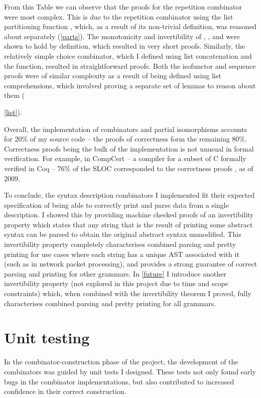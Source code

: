 \documentclass[12pt,a4paper,twoside,openright]{report}
\newcommand{\F}{\AgdaFunction}
\begin{document}
From this Table we can observe that the proofs for the repetition combinator were most complex. This is due to the repetition combinator using the list partitioning function \F{parts}, which, as a result of its non-trivial definition, was reasoned about separately (\autoref{parts}). The monotonicity and invertibility of \F{pure}, \F{token}, and \F{empty} were shown to hold by definition, which resulted in very short proofs. Similarly, the relatively simple choice combinator, which I defined using list concatenation and the \F{mplus} function, resulted in straightforward proofs. 
Both the isofunctor and sequence proofs were of similar complexity as a result of being defined using list comprehensions, which involved proving a separate set of lemmas to reason about them ({\autoref{list}).

Overall, the implementation of combinators and partial isomorphisms accounts for 20\% of my source code -- the proofs of correctness form the remaining 80\%. Correctness proofs being the bulk of the implementation is not unusual in formal verification. For example, in CompCert -- a compiler for a subset of C formally verified in Coq -- 76\% of the SLOC corresponded to the correctness proofs \cite{compcert}, as of 2009.

To conclude, the syntax description combinators I implemented fit their expected specification of being able to correctly print and parse data from a single description. I showed this by providing machine checked proofs of an invertibility property which states that any string that is the result of printing some abstract syntax can be parsed to obtain the original abstract syntax unmodified. This invertibility property completely characterises combined parsing and pretty printing for use cases where each string has a unique AST associated with it (such as in network packet processing), and provides a strong guarantee of correct parsing and printing for other grammars. In \autoref{future} I introduce another invertibility property (not explored in this project due to time and scope constraints) which, when combined with the invertibility theorem I proved, fully characterises combined parsing and pretty printing for all grammars.

\section{Unit testing} \label{unittest}

In the combinator-construction phase of the project, the development of the combinators was guided by unit tests I designed. These tests not only found early bugs in the combinator implementations, but also contributed to increased confidence in their correct construction.

}
\end{document}
